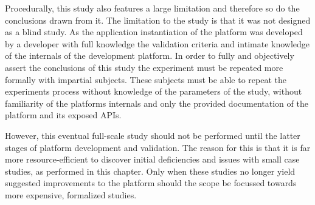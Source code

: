 Procedurally, this study also features a large limitation and therefore so do the conclusions drawn from it. The limitation to the study is that it was not designed as a blind study. As the application instantiation of the platform was developed by a developer with full knowledge the validation criteria and intimate knowledge of the internals of the development platform. In order to fully and objectively assert the conclusions of this study the experiment must be repeated more formally with impartial subjects. These subjects must be able to repeat the experiments process without knowledge of the parameters of the study, without familiarity of the platforms internals and only the provided documentation of the platform and its exposed APIs.

However, this eventual full-scale study should not be performed until the latter stages of platform development and validation. The reason for this is that it is far more resource-efficient to discover initial deficiencies and issues with small case studies, as performed in this chapter. Only when these studies no longer yield suggested improvements to the platform should the scope be focussed towards more expensive, formalized studies.
